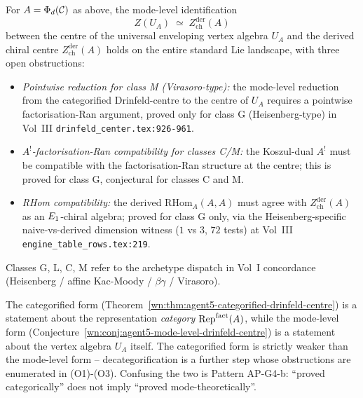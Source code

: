 \begin{conjecture}
\ClaimStatusConjectured\label{wn:conj:agent5-mode-level-drinfeld-centre}
For $A = \Phi_d(\mathcal{C})$ as above, the mode-level identification
\[
  Z(U_A) \;\simeq\; Z^{\mathrm{der}}_{\mathrm{ch}}(A)
\]
between the centre of the universal enveloping vertex algebra $U_A$ and
the derived chiral centre $Z^{\mathrm{der}}_{\mathrm{ch}}(A)$ holds on
the entire standard Lie landscape, with three open obstructions:
\begin{itemize}
\item[(O1)] \emph{Pointwise reduction for class M (Virasoro-type):} the
mode-level reduction from the categorified Drinfeld-centre to the
centre of $U_A$ requires a pointwise factorisation-Ran argument,
proved only for class G (Heisenberg-type) in Vol~III
\texttt{drinfeld\_center.tex:926-961}.
\item[(O2)] \emph{$A^!$-factorisation-Ran compatibility for classes C/M:}
the Koszul-dual $A^!$ must be compatible with the factorisation-Ran
structure at the centre; this is proved for class G, conjectural for
classes C and M.
\item[(O3)] \emph{RHom compatibility:} the derived $\mathrm{RHom}_A(A, A)$
must agree with $Z^{\mathrm{der}}_{\mathrm{ch}}(A)$ as an $E_1$-chiral
algebra; proved for class G only, via the Heisenberg-specific
naive-vs-derived dimension witness ($1$ vs $3$, $72$ tests) at
Vol~III \texttt{engine\_table\_rows.tex:219}.
\end{itemize}
Classes G, L, C, M refer to the archetype dispatch in Vol~I concordance
(Heisenberg / affine Kac-Moody / $\beta\gamma$ / Virasoro).
\end{conjecture}

\begin{remark}
\label{wn:rem:agent5-categorified-vs-mode}
The categorified form (Theorem~\ref{wn:thm:agent5-categorified-drinfeld-centre})
is a statement about the representation \emph{category}
$\mathrm{Rep}^{\mathrm{fact}}(A)$, while the mode-level form
(Conjecture~\ref{wn:conj:agent5-mode-level-drinfeld-centre}) is a
statement about the vertex algebra $U_A$ itself. The categorified form
is strictly weaker than the mode-level form -- decategorification is a
further step whose obstructions are enumerated in
(O1)-(O3). Confusing the two is Pattern AP-G4-b: ``proved
categorically'' does not imply ``proved mode-theoretically''.
\end{remark}

